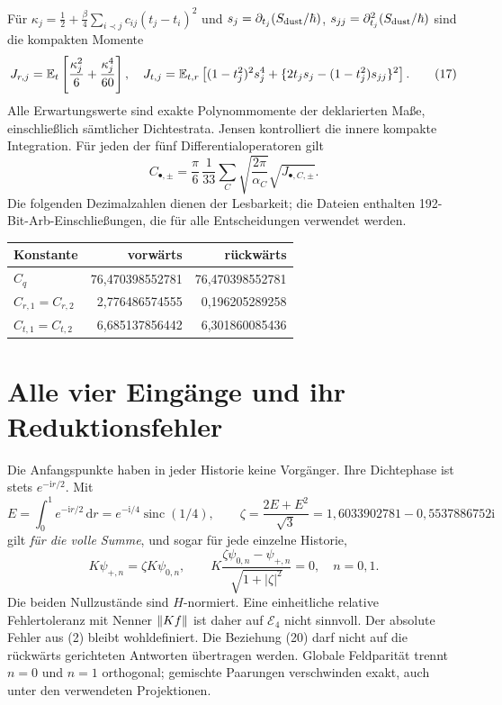 \documentclass[10pt,a4paper]{article}
\newcommand{\dd}{\,\mathrm d}\newcommand{\ii}{\mathrm i}\newcommand{\R}{\mathbb R}
\begin{document}
Für $\kappa_j=\tfrac12+\tfrac\beta4\sum_{i\prec j}c_{ij}(t_j-t_i)^2$
und $s_j=\partial_{t_j}(S_{\rm dust}/\hbar)$,
$s_{jj}=\partial_{t_j}^2(S_{\rm dust}/\hbar)$ sind die kompakten Momente
\[
 J_{r,j}=\mathbb E_t\left[\frac{\kappa_j^2}{6}+\frac{\kappa_j^4}{60}\right],\quad
 J_{t,j}=\mathbb E_{t,r}\left[(1-t_j^2)^2s_j^4+
 \{2t_js_j-(1-t_j^2)s_{jj}\}^2\right].                    \tag{17}
\]
Alle Erwartungswerte sind exakte Polynommomente der deklarierten Maße,
einschließlich sämtlicher Dichtestrata. Jensen kontrolliert die innere
kompakte Integration. Für jeden der fünf Differentialoperatoren gilt
\[
 C_{\bullet,\pm}=\frac\pi6\,\frac1{33}
 \sum_C\sqrt{\frac{2\pi}{\alpha_C}}\sqrt{J_{\bullet,C,\pm}}.        \tag{18}
\]
Die folgenden Dezimalzahlen dienen der Lesbarkeit; die Dateien enthalten
192-Bit-Arb-Einschließungen, die für alle Entscheidungen verwendet werden.
\begin{center}\begin{tabular}{lrr}\toprule
Konstante & vorwärts & rückwärts\\\midrule
$C_q$ &76,470398552781&76,470398552781\\
$C_{r,1}=C_{r,2}$ &2,776486574555&0,196205289258\\
$C_{t,1}=C_{t,2}$ &6,685137856442&6,301860085436\\\bottomrule
\end{tabular}\end{center}
\newpage

\section{Alle vier Eingänge und ihr Reduktionsfehler}
Die Anfangspunkte haben in jeder Historie keine Vorgänger. Ihre Dichtephase
ist stets $e^{-\ii r/2}$. Mit
\[
 E=\int_0^1e^{-\ii r/2}\dd r=e^{-\ii/4}\operatorname{sinc}(1/4),\qquad
 \zeta=\frac{2E+E^2}{\sqrt3}
 =1{,}6033902781-0{,}5537886752\ii                         \tag{19}
\]
gilt \emph{für die volle Summe}, und sogar für jede einzelne Historie,
\[
 K\psi_{+,n}=\zeta K\psi_{0,n},\qquad
 K\frac{\zeta\psi_{0,n}-\psi_{+,n}}{\sqrt{1+|\zeta|^2}}=0,
 \quad n=0,1.                                           \tag{20}
\]
Die beiden Nullzustände sind $H$-normiert. Eine einheitliche relative
Fehlertoleranz mit Nenner $\lVert Kf\rVert$ ist daher auf $\mathcal E_4$ nicht
sinnvoll. Der absolute Fehler aus (2) bleibt wohldefiniert. Die Beziehung
(20) darf nicht auf die rückwärts gerichteten Antworten übertragen werden.
Globale Feldparität trennt $n=0$ und $n=1$ orthogonal; gemischte Paarungen
verschwinden exakt, auch unter den verwendeten Projektionen.
\end{document}
